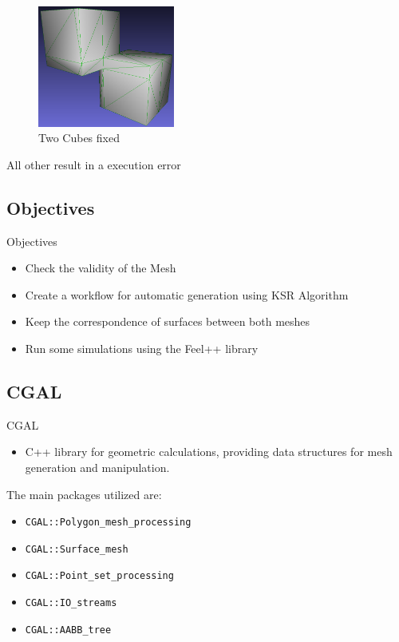 \documentclass[10pt]{beamer}
\begin{document}
\begin{frame}
\begin{figure}
    \centering
    \includegraphics[width=0.4\textwidth]{../image/2_cubes_fixed.png}
    \caption{Two Cubes fixed}
  \end{figure}
All other result in a execution error
\end{frame}

\subsection{Objectives}
\begin{frame}{Objectives}
    \begin{itemize}
        \item Check the validity of the Mesh
        \item Create a workflow for automatic generation using KSR Algorithm
        \item Keep the correspondence of surfaces between both meshes
        \item Run some simulations using the Feel++ library
    \end{itemize}
\end{frame}

\subsection{CGAL}
\begin{frame}{CGAL}
    \begin{itemize}
        \item C++ library for geometric calculations, providing data structures for mesh generation and manipulation.
    \end{itemize}
    \vspace{0.5cm}
    The main packages utilized are:
    \begin{itemize}
        \item \texttt{CGAL::Polygon\_mesh\_processing}
        \item \texttt{CGAL::Surface\_mesh}
        \item \texttt{CGAL::Point\_set\_processing}
        \item \texttt{CGAL::IO\_streams}
        \item \texttt{CGAL::AABB\_tree}
    \end{itemize}
    
\end{frame}
\end{document}
